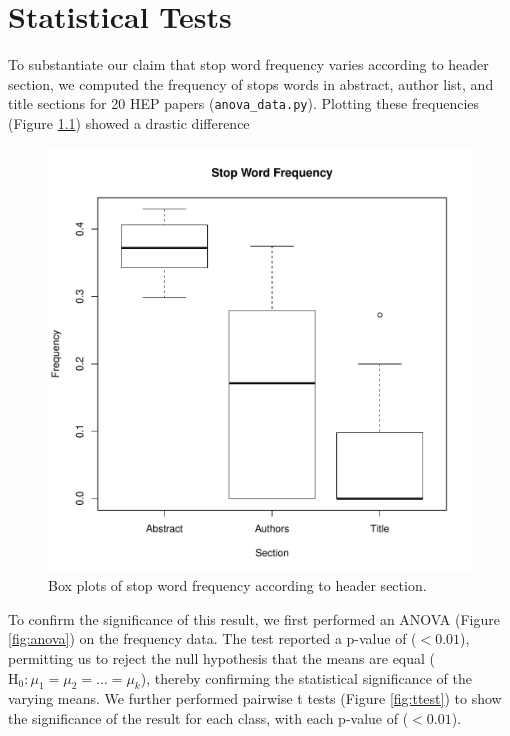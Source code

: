 
\chapter{Statistical Tests} %

\label{AppendixC} %


To substantiate our claim that stop word frequency varies according to header section, we computed the frequency of stops words in  abstract, author list, and title sections for 20 HEP papers (\texttt{anova\_data.py}). Plotting these frequencies (Figure \ref{fig:means}) showed a drastic difference

\begin{figure}[!ht]
\center
\includegraphics[width=4.5in]{Figures/means.pdf}
\caption{Box plots of stop word frequency according to header section.}
\label{fig:means}
\end{figure}

To confirm the significance of this result, we first performed an ANOVA (Figure \ref{fig:anova}) on the frequency data. The test reported a p-value of ($< 0.01$), permitting us to reject the null hypothesis that the means are equal ($\text{H}_0: \mu_1 = \mu_2 = \dots = \mu_k$), thereby confirming the statistical significance of the varying means. We further performed pairwise t tests (Figure \ref{fig:ttest}) to show the significance of the result for each class, with each p-value of ($< 0.01$).

